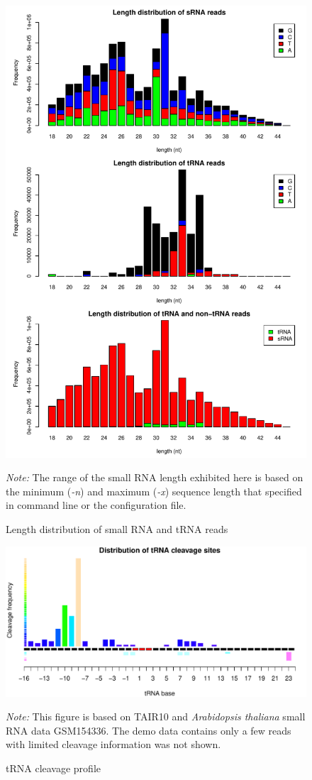 \documentclass[11pt, a4paper]{article}
\begin{document}
\begin{figure}[htbp]
\begin{center}
\includegraphics[width=12cm]{distribution.pdf}
\caption{Length distribution of small RNA and tRNA reads}
\label{distribution}
\end{center}
\emph{Note:} The range of the small RNA length exhibited here is based on the minimum (\emph{-n}) and maximum (\emph{-x}) sequence length that specified in command line or the configuration file.
\end{figure}

\begin{figure}[htbp]
\begin{center}
\includegraphics[width=13cm]{cleavage_profile.pdf}
\caption{tRNA cleavage profile}
\label{cleavage}
\end{center}
\emph{Note:} This figure is based on TAIR10 and \textit{Arabidopsis thaliana} small RNA data GSM154336. The demo data contains only a few reads with limited cleavage information was not shown.
\end{figure}
\end{document}
